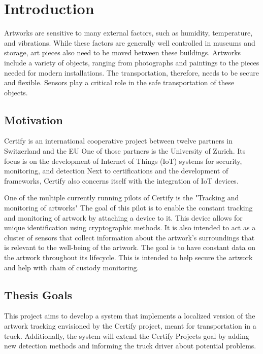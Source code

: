 \chapter{Introduction}
\label{introduction}


Artworks are sensitive to many external factors, such as humidity, temperature, and vibrations.
While these factors are generally well controlled in museums and storage, art pieces also need to be moved between these buildings.
Artworks include a variety of objects, ranging from photographs and paintings to the pieces needed for modern installations.
The transportation, therefore, needs to be secure and flexible.
Sensors play a critical role in the safe transportation of these objects.


\section{Motivation}

Certify is an international cooperative project between twelve partners in Switzerland and the EU %
One of those partners is the University of Zurich.
Its focus is on the development of Internet of Things (IoT) systems for security, monitoring, and detection %
Next to certifications and the development of frameworks, Certify also concerns itself with the integration of IoT devices.


One of the multiple currently running pilots of Certify is the "Tracking and monitoring of artworks" %
The goal of this pilot is to enable the constant tracking and monitoring of artwork by attaching a device to it.
This device allows for unique identification using cryptographic methods.
It is also intended to act as a cluster of sensors that collect information about the artwork's surroundings that is relevant to the well-being of the artwork.
The goal is to have constant data on the artwork throughout its lifecycle.
This is intended to help secure the artwork and help with chain of custody monitoring.



\section{Thesis Goals}

This project aims to develop a system that implements a localized version of the artwork tracking envisioned by the Certify project, meant for transportation in a truck.
Additionally, the system will extend the Certify Projects goal by adding new detection methods and informing the truck driver about potential problems.


